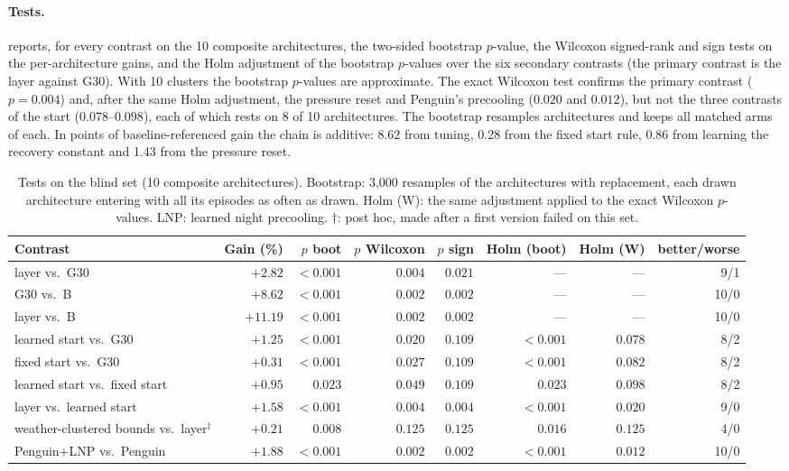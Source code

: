 \paragraph{Tests.}  reports, for every contrast on the 10 composite architectures, the two-sided
bootstrap $p$-value, the Wilcoxon signed-rank and sign tests on the per-architecture gains, and the Holm adjustment of
the bootstrap $p$-values over the six secondary contrasts (the primary contrast is the layer against G30). With 10 clusters
the bootstrap $p$-values are approximate. The exact Wilcoxon test confirms the primary contrast ($p = 0.004$) and, after the
same Holm adjustment, the pressure reset and Penguin's precooling ($0.020$ and $0.012$), but not the three contrasts of the
start ($0.078$--$0.098$), each of which rests on 8 of 10 architectures.
The bootstrap resamples architectures and keeps all matched arms of each. In points of baseline-referenced gain the
chain is additive: 8.62 from tuning, 0.28 from the fixed start rule, 0.86 from learning the recovery constant and 1.43
from the pressure reset.
\begin{table}[!htbp]
\centering
\setlength{\tabcolsep}{3pt}
\caption{Tests on the blind set (10 composite architectures). Bootstrap: 3,000 resamples of the architectures with replacement, each drawn architecture entering with all its episodes as often as drawn. Holm (W): the same adjustment applied to the exact Wilcoxon $p$-values. LNP: learned night precooling. $\dagger$: post hoc, made after a first
version failed on this set.}
\label{tab:tests}
\footnotesize
\begin{tabular}{lrrrrrrr}
\toprule
Contrast & Gain (\%) & $p$ boot & $p$ Wilcoxon & $p$ sign & Holm (boot) & Holm (W) & better/worse\\
\midrule
layer vs.\ G30 & $+2.82$ & $<0.001$ & $0.004$ & $0.021$ & --- & --- & 9/1\\
G30 vs.\ B & $+8.62$ & $<0.001$ & $0.002$ & $0.002$ & --- & --- & 10/0\\
layer vs.\ B & $+11.19$ & $<0.001$ & $0.002$ & $0.002$ & --- & --- & 10/0\\
learned start vs.\ G30 & $+1.25$ & $<0.001$ & $0.020$ & $0.109$ & $<0.001$ & $0.078$ & 8/2\\
fixed start vs.\ G30 & $+0.31$ & $<0.001$ & $0.027$ & $0.109$ & $<0.001$ & $0.082$ & 8/2\\
learned start vs.\ fixed start & $+0.95$ & $0.023$ & $0.049$ & $0.109$ & $0.023$ & $0.098$ & 8/2\\
layer vs.\ learned start & $+1.58$ & $<0.001$ & $0.004$ & $0.004$ & $<0.001$ & $0.020$ & 9/0\\
weather-clustered bounds vs.\ layer$^\dagger$ & $+0.21$ & $0.008$ & $0.125$ & $0.125$ & $0.016$ & $0.125$ & 4/0\\
Penguin+LNP vs.\ Penguin & $+1.88$ & $<0.001$ & $0.002$ & $0.002$ & $<0.001$ & $0.012$ & 10/0\\
\bottomrule
\end{tabular}
\end{table}

